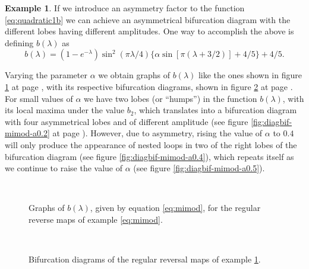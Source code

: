 \documentclass[10pt,twoside,titlepage]{book}
\numberwithin{equation}{chapter}
\numberwithin{figure}{chapter}
\numberwithin{table}{chapter}
\theoremstyle{plain}%
\theoremstyle{definition}
\newtheorem{example}{Example}[chapter]
\theoremstyle{remark}
\begin{document}
\begin{example}
	\label{eg:mimod} If we introduce an asymmetry factor to the function \ref{eq:quadratic1b} we can achieve an asymmetrical bifurcation diagram with the different lobes having different amplitudes. One way to accomplish the above is defining $b(\lambda)$ as
	\begin{equation}
		b(\lambda)=\left(1-e^{-\lambda}\right)\sin^{2}\left(\pi\lambda/4\right)\{\alpha\sin\left[\pi\left(\lambda+3/2\right)\right]+4/5\}+4/5.
		\label{eq:mimod}
	\end{equation}
	
	Varying the parameter $\alpha$ we obtain graphs of $b(\lambda)$ like the ones shown in figure \ref{fig:blambda-mimod} at page \pageref{fig:blambda-mimod}, with its respective bifurcation diagrams, shown in figure \ref{fig:diagbif-mimod} at page \pageref{fig:diagbif-mimod}. For small values of $\alpha$ we have two lobes (or ``humps'') in the function $b(\lambda)$, with its local maxima under the value $b_{2}$, which translates into a bifurcation diagram with four asymmetrical lobes and of different amplitude (see figure \ref{fig:diagbif-mimod-a0.2} at page \pageref{fig:diagbif-mimod-a0.2}). However, due to asymmetry, rising the value of $\alpha$ to $0.4$ will only produce the appearance of nested loops in two of the right lobes of the bifurcation diagram (see figure \ref{fig:diagbif-mimod-a0.4}), which repeats itself as we continue to raise the value of $\alpha$ (see figure \ref{fig:diagbif-mimod-a0.5}).
	
	\begin{figure}
		\centering
		\\
		\caption{Graphs of $b(\lambda)$, given by equation \ref{eq:mimod}, for the regular reverse maps of example \ref{eq:mimod}.}
		\label{fig:blambda-mimod}
	\end{figure}
	
	\begin{figure}
		\centering
		\\
		\caption{Bifurcation diagrams of the regular reversal maps of example \ref{eg:mimod}.}
		\label{fig:diagbif-mimod}
	\end{figure}
	

\end{example}
\end{document}
